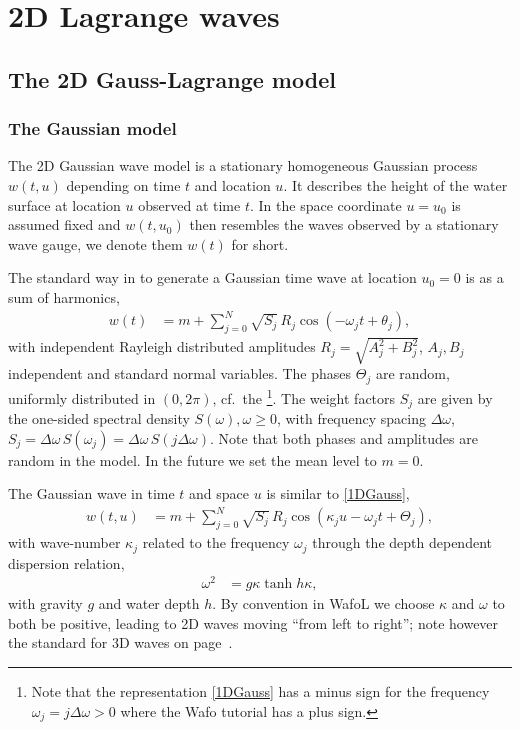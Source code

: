 \chapter{2D Lagrange waves}\label{cha_1}
\section{The 2D Gauss-Lagrange model}\label{sec:whatiswafo}
\subsection{The Gaussian model}\label{ss:gauss}
The 2D Gaussian wave model is a stationary homogeneous Gaussian process $w(t,u)$
depending on time $t$ and location $u$. It describes the height of the water surface at
location $u$ observed at time $t$.
In \progname{} the space coordinate $u=u_0$ is assumed fixed and $w(t,u_0)$ then
 resembles the waves observed by a stationary wave gauge, we denote them $w(t)$ for short.

The standard way in \pn{} to generate a Gaussian time wave at location $u_0 = 0$ is as a sum of harmonics,
\begin{align}
w(t) &= m + \sum_{j=0}^{N} \sqrt{S_j}\, R_j \cos (- \omega _j t + \theta _j),
\label{1DGauss}
\end{align}
with independent Rayleigh distributed amplitudes $R_j = \sqrt{A_j^2 + B_j^2}$, $A_j, B_j$ independent and standard normal variables. The phases $\Theta_j$ are random,  uniformly distributed in $(0, 2 \pi)$, cf.\  the 
\cite[Sec. 2.2.2]{WAFO-group2017Wafo}\footnote{Note that the representation \eqref{1DGauss}
has a minus sign for the frequency $\omega_j  = j\Delta \omega > 0$
where the {\sc Wafo} tutorial has a plus sign. }.
The weight factors $S_j$ are given by the one-sided spectral density $S(\omega), \omega \geq 0$,   with frequency spacing $\Delta \omega$, $S_j =\Delta \omega \,  S(\omega_j) =
\Delta \omega \, S(j \Delta\omega)$. Note that both phases and amplitudes are random in the \pn{} model. In the future we set the mean level to $m = 0$.

The Gaussian wave in time $t$ and space $u$ is similar to \eqref{1DGauss},
\begin{align}
w(t,u) &= m +
\sum_{j=0}^{N} \sqrt{S_j}\, R_j \cos (\kappa_j u - \omega _j t + \Theta _j),
\label{2DGauss}
\end{align}
with wave-number $\kappa_j$ related to the frequency $\omega_j$ through the depth dependent dispersion relation,
\begin{align}
\omega ^2 &= g \kappa \tanh h \kappa, \label{dispersionrelation}
\end{align}
with gravity $g$ and water depth $h$. By convention in {\sc Wafo}L we choose $\kappa$ and $\omega$ 
to both be positive, leading to 2D waves moving ``from left to right''; note however the standard for 3D 
waves on page~\pageref{wavedirection}. 

